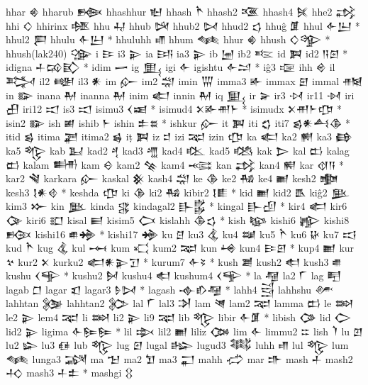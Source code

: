  hhar  𒄯   
 hharub  𒁬   
 hhashhur  𒈢   
 hhash  𒋻   
 hhash2  𒍨   
 hhash4  𒍮   
 hhe2  𒃶   
 hhi  𒄭   
 hhirinx  𒆶   
 hhu  𒄷   
 hhub  𒄽   
 hhub2  𒄸   
 hhud2  𒌓   
 hhuĝ  𒂠   
 hhul  𒅆𒌨 *   
 hhul2  𒄾   
 hhulu  𒅆𒌨 *   
 hhuluhh  𒈛   
 hhum  𒈝   
 hhur  𒄯   
 hhush  𒄭𒄊 *   
 hhush(lak240)  𒍽   
 i  𒄿   
 i3  𒉌   
 ia  𒅀   
 ia3  𒉌   
 ib  𒅁   
 ib2  𒌈   
 id  𒀉   
 id2  𒀀𒇉 *   
 idigna  𒈦𒄘𒃼 *   
 idim  𒅂   
 ig  𒅅   
 igi  𒅆   
 igishtu  𒅆𒁺 *   
 iĝ3  𒉘   
 ihh  𒄴   
 il  𒅋   
 il2  𒅍   
 il3  𒀭   
 im  𒅎   
 im2  𒁽   
 imin  𒅓   
 imma3  𒅊   
 immax  𒇋   
 immal  𒉥   
 in  𒅔   
 inana  𒈹   
 inanna  𒈹   
 inim  𒅗   
 innin  𒈹   
 iq  𒅅   
 ir  𒅕   
 ir3  𒀴   
 ir11  𒀵   
 iri  𒌷   
 iri12  𒀊   
 is3  𒀊   
 isimu3  𒌋𒀜 *   
 isimud4  𒉽𒅊𒉣𒈨 *   
 isimudx  𒉽𒉣𒈨𒂡 *   
 isin2  𒅔   
 ish  𒅖   
 ishib  𒈨   
 ishin  𒉺𒊺 *   
 ishkur  𒅎   
 it  𒀉   
 iti  𒌚   
 iti7  𒌗𒀭𒋀𒆠 *   
 itid  𒌗   
 itima  𒃟   
 itima2  𒌖   
 iṭ  𒀉   
 iz  𒄑   
 izi  𒉈   
 izin  𒂡   
 ka  𒅗   
 ka2  𒆍   
 ka3  𒂵   
 ka5  𒈜   
 kab  𒆏   
 kad2  𒆐   
 kad3  𒆑   
 kad4  𒆒   
 kad5  𒆓   
 kak  𒆕   
 kal  𒆗   
 kalag  𒆗   
 kalam  𒌦   
 kam  𒄰   
 kam2  𒆚   
 kam4  𒆛   
 kan  𒃶   
 kan4  𒆍   
 kar  𒋼𒀀 *   
 kar2  𒃸   
 karkara  𒅎   
 kaskal  𒆜   
 kash4  𒁽   
 ke  𒆠   
 ke2  𒄀   
 ke4  𒆤   
 kesh2  𒆟   
 kesh3  𒋙𒀭𒄲 *   
 keshda  𒂡   
 ki  𒆠   
 ki2  𒄀   
 kibir2  𒋙𒀾 *   
 kid  𒆤   
 kid2  𒋺   
 kiĝ2  𒆥   
 kim3  𒁍   
 kin  𒆥   
 kinda  𒃱   
 kindagal2  𒃲𒌵 *   
 kingal  𒃲𒌺 *   
 kir4  𒅗   
 kir6  𒀘   
 kiri6  𒊬   
 kisal  𒆦   
 kisim5  𒆨   
 kislahh  𒆠𒌓 *   
 kish  𒆧   
 kishi6  𒊾   
 kishi8  𒁞   
 kishi16  𒌑𒄉 *   
 kishi17  𒄉   
 ku  𒆪   
 ku3  𒆬   
 ku4  𒆭   
 ku5  𒋻   
 ku6  𒄩   
 ku7  𒆯   
 kud  𒋻   
 kug  𒆬   
 kul  𒆰   
 kum  𒄣   
 kum2  𒉈   
 kun  𒆲   
 kun4  𒄿𒇻 *   
 kup4  𒆤   
 kur  𒆳   
 kur2  𒉽   
 kurku2  𒅗𒀭𒉌𒋛 *   
 kurum7  𒅆𒂟 *   
 kush  𒋢   
 kush2  𒊨   
 kush3  𒌑   
 kushu  𒌋𒊊 *   
 kushu2  𒆵   
 kushu4  𒊨   
 kushum4  𒌋𒊊 *   
 la  𒆷   
 la2  𒇲   
 lag  𒋃   
 lagab  𒆸   
 lagar  𒇬   
 lagar3  𒊩𒄸 *   
 lagash  𒉢𒁓𒆷 *   
 lahh4  𒁻   
 lahhshu  𒇱   
 lahhtan  𒉴   
 lahhtan2  𒉶   
 lal  𒇲   
 lal3  𒋭   
 lam  𒇴   
 lam2  𒉈   
 lamma  𒆗   
 le  𒇷   
 le2  𒉌   
 lem4  𒉈   
 li  𒇷   
 li2  𒉌   
 li9  𒉈   
 lib  𒈜   
 libir  𒅆𒂠 *   
 libish  𒀚   
 lid  𒀖   
 lid2  𒉌   
 ligima  𒅆𒌉𒌉 *   
 lil  𒇸   
 lil2  𒆤   
 liliz  𒀗   
 lim  𒅆   
 limmu2  𒇹   
 lish  𒇺   
 lu  𒇻   
 lu2  𒇽   
 lu3  𒈖   
 lub  𒈜   
 lug  𒇻   
 lugal  𒈗   
 lugud3  𒈟   
 luhh  𒈛   
 lul  𒈜   
 lum  𒈝   
 lunga3  𒋋   
 ma  𒈠   
 ma2  𒈣   
 ma3  𒂷   
 mahh  𒈤   
 mar  𒈥   
 mash  𒈦   
 mash2  𒈧   
 mash3  𒈦𒉺 *   
 mashgi  𒌐   
